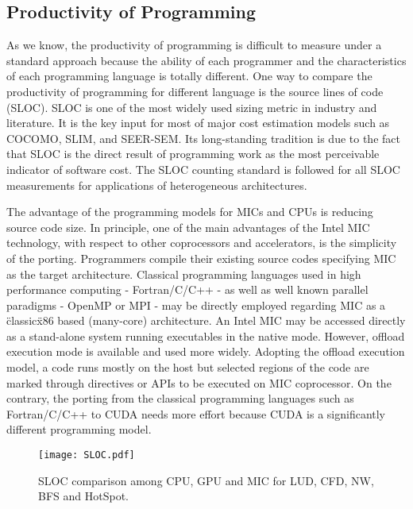 \subsection{Productivity of Programming} 
As we know, the productivity of programming is difficult to measure under a standard approach because the ability of each programmer and the characteristics of each programming language is totally different. One way to compare the productivity of programming for different language is the source lines of code (SLOC). SLOC is one of the most widely used sizing metric in industry and literature. It is the key input for most of major cost estimation models such as COCOMO, SLIM, and SEER-SEM.  Its long-standing tradition is due to the fact that SLOC is the direct result of programming work as the most perceivable indicator of software cost. The SLOC counting standard \cite{nguyen2007sloc} is followed for all SLOC measurements for applications of heterogeneous architectures.

 The advantage of the programming models for MICs and CPUs is reducing source code size. In principle, one of the main advantages of the Intel MIC technology, with respect to other coprocessors and accelerators, is the simplicity of the porting. Programmers compile their existing source codes specifying MIC as the target architecture. Classical programming languages used in high performance computing - Fortran/C/C++ - as well as well known parallel paradigms - OpenMP or MPI - may be directly employed regarding MIC as a \"classic\" x86 based (many-core) architecture. An Intel MIC may be accessed directly as a stand-alone system running executables in the native mode. However, offload execution mode is available and used more widely. Adopting the offload execution model, a code runs mostly on the host but selected regions of the code are marked through directives or APIs to be executed on MIC coprocessor. On the contrary, the porting from the classical programming languages such as Fortran/C/C++ to CUDA needs more effort because CUDA is a significantly different programming model.

  
    \begin{figure}[h!]
  \centering
  \begin{minipage}{0.5\textwidth}
    \centering
   \centering
     \texttt{[image: SLOC.pdf]}    
  \caption{SLOC comparison among CPU, GPU and MIC for LUD, CFD, NW, BFS and HotSpot.}
  \label{fig:sloc}
\end{minipage}%
\end{figure}

